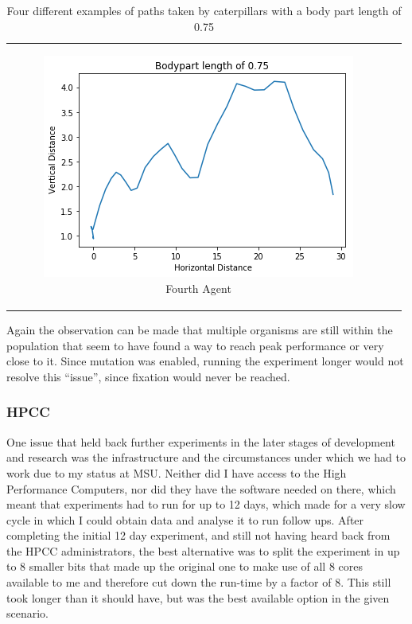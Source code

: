 \documentclass[12pt,oneside,listof=totoc,paper=a4,headings=small]{scrbook}
\begin{document}
{\begin{table}[h!]
\begin{tabular}{cc}
\begin{subfigure}{0.4\textwidth}\centering\includegraphics[width=0.75\columnwidth]{images/length_075_4.png}\caption{Fourth Agent}\label{fig:fourplotlengthd}\end{subfigure}\\
\end{tabular}
\caption{Four different examples of paths taken by caterpillars with a body part length of 0.75}
\label{tab:fourplotlength}
\end{table}
}

Again the observation can be made that multiple organisms are still within the population that seem to have found a way to reach peak performance or very close to it. Since mutation was enabled, running the experiment longer would not resolve this ``issue'', since fixation would never be reached. 




\subsubsection{HPCC} \label{sssec:hpcc}
One issue that held back further experiments in the later stages of development and research was the infrastructure and the circumstances under which we had to work due to my status at MSU. Neither did I have access to the High Performance Computers, nor did they have the software needed on there, which meant that experiments had to run for up to 12 days, which made for a very slow cycle in which I could obtain data and analyse it to run follow ups. After completing the initial 12 day experiment, and still not having heard back from the HPCC administrators, the best alternative was to split the experiment in up to 8 smaller bits that made up the original one to make use of all 8 cores available to me and therefore cut down the run-time by a factor of 8. This still took longer than it should have, but was the best available option in the given scenario.
\newpage
\end{document}
